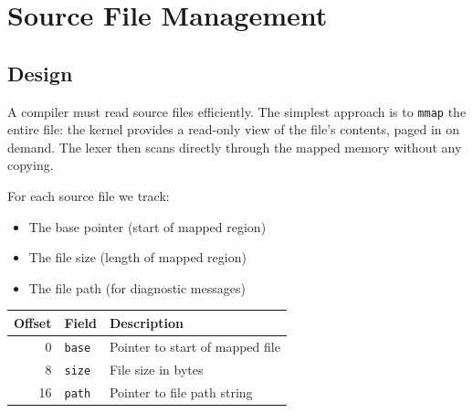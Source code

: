 \documentclass[11pt,a4paper,twoside,openright,DIV=15]{scrbook}
\theoremstyle{definition}
\theoremstyle{plain}
\theoremstyle{remark}
\begin{document}
\chapter{Source File Management}
\label{ch:source}

\section{Design}

A compiler must read source files efficiently.  The simplest approach
is to \texttt{mmap} the entire file: the kernel provides a read-only
view of the file's contents, paged in on demand.  The lexer then scans
directly through the mapped memory without any copying.

For each source file we track:
\begin{itemize}
\item The base pointer (start of mapped region)
\item The file size (length of mapped region)
\item The file path (for diagnostic messages)
\end{itemize}

\begin{center}
\begin{tabular}{rll}
\hline
Offset & Field & Description \\
\hline
0  & \texttt{base} & Pointer to start of mapped file \\
8  & \texttt{size} & File size in bytes \\
16 & \texttt{path} & Pointer to file path string \\
\hline
\end{tabular}
\end{center}
\end{document}
